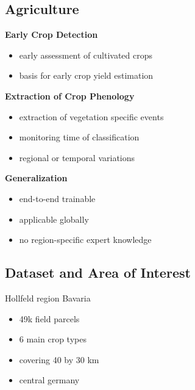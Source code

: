 \documentclass[a0]{tumposter}
\begin{document}
\begin{minipage}[t]{.65\textwidth}
	\begin{minipage}[t]{.5\textwidth}
	\subsection{Agriculture}
	
	\small
	
	\vspace{1em}
	
		\textbf{Early Crop Detection}
		\begin{itemize}
			\item early assessment of cultivated crops
			\item basis for early crop yield estimation
		\end{itemize}
		\vspace{.3em}
		
		\textbf{Extraction of Crop Phenology}
		\begin{itemize}
			\item extraction of vegetation specific events 
			\item monitoring time of classification
			\item regional or temporal variations
		\end{itemize}
		\vspace{.3em}
		
		\textbf{Generalization}
		\begin{itemize}
			\item end-to-end trainable
			\item applicable globally
			\item no region-specific expert knowledge
		\end{itemize}
	
	\end{minipage}
	\begin{minipage}[t]{.66\textwidth}
	\subsection{Dataset and Area of Interest} \par
	\begin{minipage}{.49\textwidth}
		\small
		\vspace{1em}
		Hollfeld region Bavaria
		\begin{itemize}
			\item 49k field parcels
			\item 6 main crop types
			\item covering 40 by 30 km
			\item central germany
		\end{itemize}
		

\end{minipage}
\end{minipage}
\end{minipage}
\end{document}
